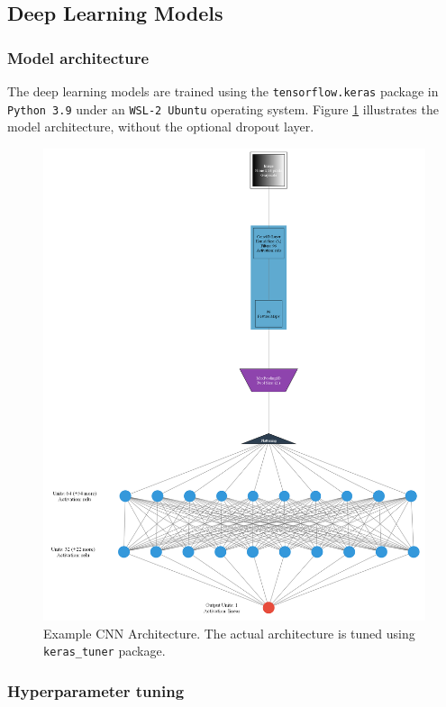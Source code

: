 \documentclass[12pt]{article}
\begin{document}
\subsection{Deep Learning Models}

\subsubsection{Model architecture}
The deep learning models are trained using the \texttt{tensorflow.keras} package in \texttt{Python 3.9} under an \texttt{WSL-2 Ubuntu} operating system. Figure \ref{fig:cnn_arch} illustrates the model architecture, without the optional dropout layer.

\begin{figure}[H]
    \centering
    \caption{Example CNN Architecture. The actual architecture is tuned using \texttt{keras\_tuner} package.}
    \label{fig:cnn_arch}
    \includegraphics[width=\textwidth]{../figures/nn.png}
\end{figure}

\subsubsection{Hyperparameter tuning}
\label{sec: hyperparam_tuning}
\end{document}
